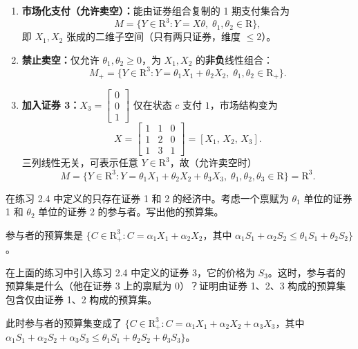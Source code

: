 \begin{solution}
\begin{enumerate}[label=(\alph*)]
    \item \textbf{市场化支付（允许卖空）：}能由证券组合复制的 1 期支付集合为
    \[
        M=\bigl\{Y\in\mathrm{R}^{3}: Y=X\theta,\;\theta_1,\theta_2\in\mathrm{R}\bigr\},
    \]
    即 $X_1,X_2$ 张成的二维子空间（只有两只证券，维度 $\le 2$）。

    \item \textbf{禁止卖空：}仅允许 $\theta_1,\theta_2\ge 0$，为 $X_1,X_2$ 的\textbf{非负}线性组合：
    \[
        M_{+}=\bigl\{Y\in\mathrm{R}^{3}: Y=\theta_1 X_1+\theta_2 X_2,\;\theta_1,\theta_2\in\mathrm{R}_{+}\bigr\}.
    \]

    \item \textbf{加入证券 3：}$X_3=\begin{bmatrix}0 \\ 0 \\ 1\end{bmatrix}$ 仅在状态 $c$ 支付 $1$，市场结构变为
    \[
        X=\begin{bmatrix}1&1&0\\1&2&0\\1&3&1\end{bmatrix}=[X_1,\,X_2,\,X_3].
    \]
    三列线性无关，可表示任意 $Y\in\mathrm{R}^{3}$，故（允许卖空时）
    \[
        M=\bigl\{Y\in\mathrm{R}^{3}: Y=\theta_1 X_1+\theta_2 X_2+\theta_3 X_3,\;\theta_1,\theta_2,\theta_3\in\mathrm{R}\bigr\}=\mathrm{R}^{3}.
    \]
\end{enumerate}
\end{solution}

\begin{problem}
 在练习 2.4 中定义的只存在证券 1 和 2 的经济中。考虑一个禀赋为 $\theta_{1}$ 单位的证券 1 和 $\theta_{2}$ 单位的证券 2 的参与者。写出他的预算集。
\end{problem}
\begin{solution}
参与者的预算集是 $\{C\in\mathrm{R}_{+}^{3}:C=\alpha_{1}X_{1}+\alpha_{2}X_{2}$，其中 $\alpha_{1}S_{1}+\alpha_{2}S_{2}\le\theta_{1}S_{1}+\theta_{2}S_{2}\}$。
\end{solution}

\begin{problem}
 在上面的练习中引入练习 2.4 中定义的证券 3，它的价格为 $S_{3}$。这时，参与者的预算集是什么（他在证券 3 上的禀赋为 0）？证明由证券 1、2、3 构成的预算集包含仅由证券 1、2 构成的预算集。
\end{problem}
\begin{solution}
此时参与者的预算集变成了 $\{C\in\mathrm{R}_{+}^{3}:C=\alpha_{1}X_{1}+\alpha_{2}X_{2}+\alpha_{3}X_{3}$，其中 $\alpha_{1}S_{1}+\alpha_{2}S_{2}+\alpha_{3}S_{3}\le\theta_{1}S_{1}+\theta_{2}S_{2}+\theta_{3}S_{3}\}$。
\end{solution}


